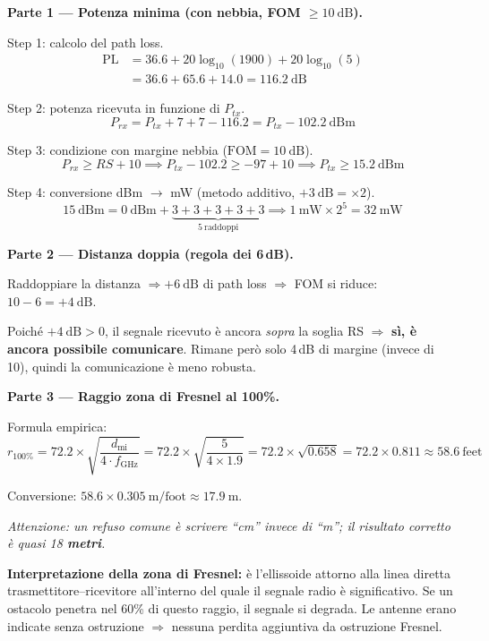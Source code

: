 \documentclass{report}
\begin{document}
\begin{solution}
\textbf{Parte 1 --- Potenza minima (con nebbia, FOM $\geq 10\ \text{dB}$).}

Step 1: calcolo del path loss.
\begin{align*}
  \text{PL} &= 36.6 + 20\log_{10}(1900) + 20\log_{10}(5) \\
            &= 36.6 + 65.6 + 14.0 = 116.2\ \text{dB}
\end{align*}

Step 2: potenza ricevuta in funzione di $P_{tx}$.
\[
  P_{rx} = P_{tx} + 7 + 7 - 116.2 = P_{tx} - 102.2\ \text{dBm}
\]

Step 3: condizione con margine nebbia ($\text{FOM}=10\ \text{dB}$).
\[
  P_{rx} \geq RS + 10 \implies P_{tx} - 102.2 \geq -97 + 10
  \implies P_{tx} \geq 15.2\ \text{dBm}
\]

Step 4: conversione dBm $\to$ mW (metodo additivo, $+3\ \text{dB} = \times 2$).
\[
  15\ \text{dBm} = 0\ \text{dBm} + \underbrace{3+3+3+3+3}_{5\ \text{raddoppi}}
  \implies 1\ \text{mW} \times 2^5 = \boxed{32\ \text{mW}}
\]

\medskip
\textbf{Parte 2 --- Distanza doppia (regola dei 6\,dB).}

Raddoppiare la distanza $\Rightarrow +6\ \text{dB}$ di path loss $\Rightarrow$
FOM si riduce: $10 - 6 = +4\ \text{dB}$.

Poiché $+4\ \text{dB} > 0$, il segnale ricevuto è ancora \emph{sopra} la soglia
RS $\Rightarrow$ \textbf{sì, è ancora possibile comunicare}. Rimane però solo
4\,dB di margine (invece di 10), quindi la comunicazione è meno robusta.

\medskip
\textbf{Parte 3 --- Raggio zona di Fresnel al 100\%.}

Formula empirica:
\[
  r_{100\%} = 72.2 \times \sqrt{\frac{d_{\text{mi}}}{4 \cdot f_{\text{GHz}}}}
            = 72.2 \times \sqrt{\frac{5}{4 \times 1.9}}
            = 72.2 \times \sqrt{0.658}
            = 72.2 \times 0.811
            \approx 58.6\ \text{feet}
\]

Conversione: $58.6 \times 0.305\ \text{m/foot} \approx \boxed{17.9\ \text{m}}$.

\emph{Attenzione: un refuso comune è scrivere ``cm'' invece di ``m''; il risultato
corretto è quasi 18 \textbf{metri}.}

\medskip
\textbf{Interpretazione della zona di Fresnel:} è l'ellissoide attorno alla linea
diretta trasmettitore--ricevitore all'interno del quale il segnale radio è
significativo. Se un ostacolo penetra nel 60\% di questo raggio, il segnale
si degrada. Le antenne erano indicate senza ostruzione $\Rightarrow$ nessuna
perdita aggiuntiva da ostruzione Fresnel.
\end{solution}
\end{document}
